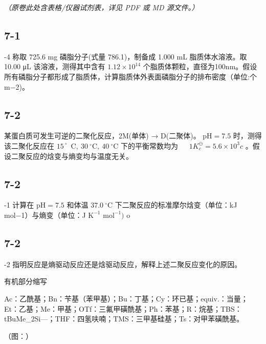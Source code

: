 \textit{（原卷此处含表格/仪器试剂表，详见 PDF 或 MD 源文件。）}

\subsection*{7-1}
-4 称取 725.6 mg 磷脂分⼦(式量 786.1)，制备成 1.000 mL 脂质体⽔溶液。取 10.00 μL 该溶液，测得其中含有 $1 . 1 2 \times 1 0 ^ { 1 4 }$ 个脂质体颗粒，直径为100nm。假设所有磷脂分⼦都形成了脂质体，计算脂质体外表⾯磷脂分⼦的排布密度（单位:个m−2)。

\subsection*{7-2}
某蛋⽩质可发⽣可逆的⼆聚化反应，2M(单体) → D(⼆聚体)。 $\mathrm { p H } = 7 . 5$ 时，测得该⼆聚化反应在 $1 5 ^ { \mathrm { ~ \circ ~ } }$ $\mathrm { C } , \ 3 0 \ ^ { \circ } \mathrm { C } , \ 4 0 \ ^ { \circ } \mathrm { C }$ 下的平衡常数均为 $\phantom { - } 1 K _ { c } ^ { \ominus } = 5 . 6 \times 1 0 ^ { 3 } c$ 。假设⼆聚反应的焓变与熵变均与温度⽆关。

\subsection*{7-2}
-1 计算在 $\mathrm { p H } = 7 . 5$ 和体温 $3 7 . 0 ~ ^ { \circ } \mathrm { C }$ 下⼆聚反应的标准摩尔焓变（单位：kJ mol−1）与熵变（单位：J $\mathrm { K } ^ { - 1 }$ $\mathrm { m o l ^ { - 1 } } )$ o

\subsection*{7-2}
-2 指明反应是熵驱动反应还是焓驱动反应，解释上述⼆聚反应变化的原因。

有机部分缩写

Ac：⼄酰基；Bn：苄基（苯甲基）；Bu：丁基；Cy：环已基；equiv.：当量；Et：⼄基；Me：甲基；OTf：三氟甲磺酰基；Ph：苯基；R：烷基；TBS：tBuMe_{2}Si—；THF：四氢呋喃；TMS：三甲基硅基；Ts：对甲苯磺酰基。

（图：）
